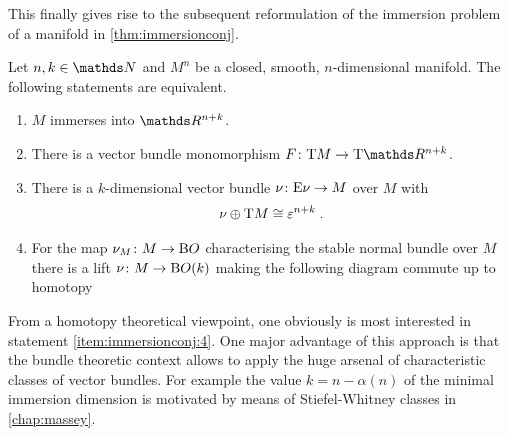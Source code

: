 This finally gives rise to the subsequent reformulation of the
immersion problem of a manifold in \autoref{thm:immersionconj}.
\begin{Thm}\label{thm:immersionconj:equivalences}
  Let $n,k\in\Nat$ and $M^n$ be a closed, smooth, $n$-dimensional manifold.
  The following statements are equivalent.
  \begin{enumerate}
  \item\label{item:immersionconj:1}
    $M$ immerses into $\R^{n+k}$.
  \item\label{item:immersionconj:2}
    There is a vector bundle monomorphism $F\colon\T M\to\T{\R^{n+k}}$.
  \item\label{item:immersionconj:3}
    There is a $k$-dimensional vector bundle
    $\nu_{}\colon\mathrm{E}\nu_{}\to M$ over $M$ with
    \begin{gather*}
      \nu_{}\oplus\mathrm{T}M\cong\varepsilon^{n+k}
      \;.
    \end{gather*}
  \item\label{item:immersionconj:4}
    For the map $\nu_{M}\colon M\to\mathrm{B}O$ characterising the stable
    normal bundle over $M$ there is a lift $\nu_{}\colon M\to\mathrm{B}O(k)$
    making the following diagram commute up to homotopy
    \begin{center}
    \end{center}
  \end{enumerate}
\end{Thm}
From a homotopy theoretical viewpoint, one obviously is most
interested in statement \ref{item:immersionconj:4}.
One major advantage of this approach is that the bundle theoretic
context allows to apply the huge arsenal of characteristic classes of
vector bundles.
For example the value $k=n-\alpha(n)$ of the minimal immersion dimension
is motivated by means of Stiefel-Whitney classes in \autoref{chap:massey}.

